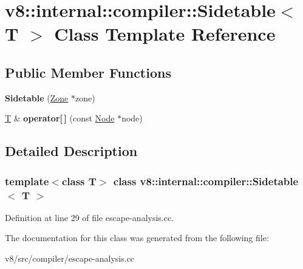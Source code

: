 \hypertarget{classv8_1_1internal_1_1compiler_1_1Sidetable}{}\section{v8\+:\+:internal\+:\+:compiler\+:\+:Sidetable$<$ T $>$ Class Template Reference}
\label{classv8_1_1internal_1_1compiler_1_1Sidetable}
\subsection*{Public Member Functions}
\begin{DoxyCompactItemize}
\item 
\mbox{\label{classv8_1_1internal_1_1compiler_1_1Sidetable_afa177eed2c67a16a2c13eafd531e2910}} 
{\bfseries Sidetable} (\mbox{\hyperlink{classv8_1_1internal_1_1Zone}{Zone}} $\ast$zone)
\item 
\mbox{\label{classv8_1_1internal_1_1compiler_1_1Sidetable_a1f2e244b3e9933b46ff145db22c4b786}} 
\mbox{\hyperlink{classv8_1_1internal_1_1torque_1_1T}{T}} \& {\bfseries operator\mbox{[}$\,$\mbox{]}} (const \mbox{\hyperlink{classv8_1_1internal_1_1compiler_1_1Node}{Node}} $\ast$node)
\end{DoxyCompactItemize}


\subsection{Detailed Description}
\subsubsection*{template$<$class T$>$\newline
class v8\+::internal\+::compiler\+::\+Sidetable$<$ T $>$}



Definition at line 29 of file escape-\/analysis.\+cc.



The documentation for this class was generated from the following file\+:\begin{DoxyCompactItemize}
\item 
v8/src/compiler/escape-\/analysis.\+cc\end{DoxyCompactItemize}
